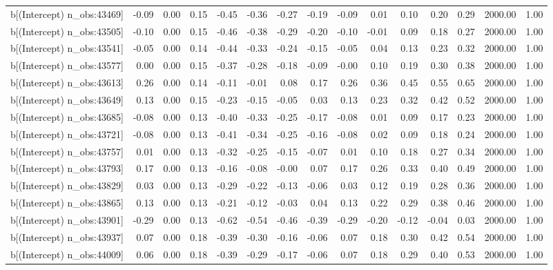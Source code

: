 \begin{table}[ht]
\begin{tabular}{rrrrrrrrrrrrrrr}
  b[(Intercept) n\_obs:43469] & -0.09 & 0.00 & 0.15 & -0.45 & -0.36 & -0.27 & -0.19 & -0.09 & 0.01 & 0.10 & 0.20 & 0.29 & 2000.00 & 1.00 \\ 
  b[(Intercept) n\_obs:43505] & -0.10 & 0.00 & 0.15 & -0.46 & -0.38 & -0.29 & -0.20 & -0.10 & -0.01 & 0.09 & 0.18 & 0.27 & 2000.00 & 1.00 \\ 
  b[(Intercept) n\_obs:43541] & -0.05 & 0.00 & 0.14 & -0.44 & -0.33 & -0.24 & -0.15 & -0.05 & 0.04 & 0.13 & 0.23 & 0.32 & 2000.00 & 1.00 \\ 
  b[(Intercept) n\_obs:43577] & 0.00 & 0.00 & 0.15 & -0.37 & -0.28 & -0.18 & -0.09 & -0.00 & 0.10 & 0.19 & 0.30 & 0.38 & 2000.00 & 1.00 \\ 
  b[(Intercept) n\_obs:43613] & 0.26 & 0.00 & 0.14 & -0.11 & -0.01 & 0.08 & 0.17 & 0.26 & 0.36 & 0.45 & 0.55 & 0.65 & 2000.00 & 1.00 \\ 
  b[(Intercept) n\_obs:43649] & 0.13 & 0.00 & 0.15 & -0.23 & -0.15 & -0.05 & 0.03 & 0.13 & 0.23 & 0.32 & 0.42 & 0.52 & 2000.00 & 1.00 \\ 
  b[(Intercept) n\_obs:43685] & -0.08 & 0.00 & 0.13 & -0.40 & -0.33 & -0.25 & -0.17 & -0.08 & 0.01 & 0.09 & 0.17 & 0.23 & 2000.00 & 1.00 \\ 
  b[(Intercept) n\_obs:43721] & -0.08 & 0.00 & 0.13 & -0.41 & -0.34 & -0.25 & -0.16 & -0.08 & 0.02 & 0.09 & 0.18 & 0.24 & 2000.00 & 1.00 \\ 
  b[(Intercept) n\_obs:43757] & 0.01 & 0.00 & 0.13 & -0.32 & -0.25 & -0.15 & -0.07 & 0.01 & 0.10 & 0.18 & 0.27 & 0.34 & 2000.00 & 1.00 \\ 
  b[(Intercept) n\_obs:43793] & 0.17 & 0.00 & 0.13 & -0.16 & -0.08 & -0.00 & 0.07 & 0.17 & 0.26 & 0.33 & 0.40 & 0.49 & 2000.00 & 1.00 \\ 
  b[(Intercept) n\_obs:43829] & 0.03 & 0.00 & 0.13 & -0.29 & -0.22 & -0.13 & -0.06 & 0.03 & 0.12 & 0.19 & 0.28 & 0.36 & 2000.00 & 1.00 \\ 
  b[(Intercept) n\_obs:43865] & 0.13 & 0.00 & 0.13 & -0.21 & -0.12 & -0.03 & 0.04 & 0.13 & 0.22 & 0.29 & 0.38 & 0.46 & 2000.00 & 1.00 \\ 
  b[(Intercept) n\_obs:43901] & -0.29 & 0.00 & 0.13 & -0.62 & -0.54 & -0.46 & -0.39 & -0.29 & -0.20 & -0.12 & -0.04 & 0.03 & 2000.00 & 1.00 \\ 
  b[(Intercept) n\_obs:43937] & 0.07 & 0.00 & 0.18 & -0.39 & -0.30 & -0.16 & -0.06 & 0.07 & 0.18 & 0.30 & 0.42 & 0.54 & 2000.00 & 1.00 \\ 
  b[(Intercept) n\_obs:44009] & 0.06 & 0.00 & 0.18 & -0.39 & -0.29 & -0.17 & -0.06 & 0.07 & 0.18 & 0.29 & 0.40 & 0.53 & 2000.00 & 1.00 \\ 

\end{tabular}
\end{table}
